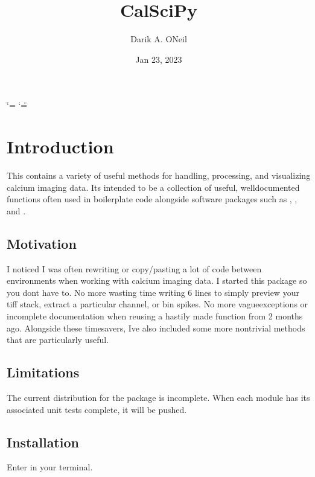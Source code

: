 \documentclass[letterpaper,10pt,english]{sphinxmanual}
\title{CalSciPy}
\date{Jan 23, 2023}
\author{Darik A.\@{} O\textquotesingle{}Neil}
\begin{document}
\ifdefined\shorthandoff
  \ifnum\catcode`\=\string=\active\shorthandoff{=}\fi
  \ifnum\catcode`\"=\active{}\fi
\fi

\pagestyle{empty}
\sphinxmaketitle
\pagestyle{plain}
\sphinxtableofcontents
\pagestyle{normal}
\label{\detokenize{index::doc}}


\sphinxstepscope


\chapter{Introduction}
\label{\detokenize{Introduction:introduction}}\label{\detokenize{Introduction::doc}}
\sphinxAtStartPar
This  contains a variety of useful methods for handling, processing, and visualizing calcium imaging data.
It\textquotesingle{}s intended to be a collection of useful, well\sphinxhyphen{}documented functions often used in boilerplate code alongside software
packages such as , ,
and .


\section{Motivation}
\label{\detokenize{Introduction:motivation}}
\sphinxAtStartPar
I noticed I was often re\sphinxhyphen{}writing or copy/pasting a lot of code between environments when working with calcium imaging
data. I started this package so you don\textquotesingle{}t have to. No more wasting time writing 6 lines to simply preview your tiff
stack, extract a particular channel, or bin spikes. No more vague\sphinxhyphen{}exceptions or incomplete documentation when re\sphinxhyphen{}using a
hastily made function from 2 months ago. Alongside these time\sphinxhyphen{}savers, I\textquotesingle{}ve also included some more non\sphinxhyphen{}trivial methods
that are particularly useful.


\section{Limitations}
\label{\detokenize{Introduction:limitations}}
\sphinxAtStartPar
The current distribution for the package is incomplete. When each module has its associated unit tests complete, it will
be pushed.


\section{Installation}
\label{\detokenize{Introduction:installation}}
\sphinxAtStartPar
Enter  in your terminal.
\end{document}
